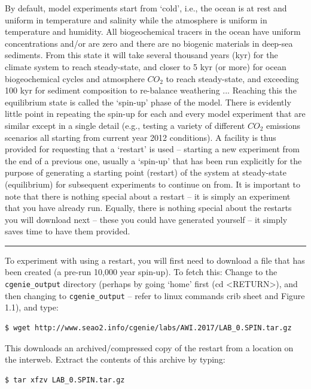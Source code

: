 \documentclass[11pt,fleqn]{book} %
\begin{document}
By default, model experiments start from ‘cold’, i.e., the ocean is at rest and uniform in temperature and salinity while the atmosphere is uniform in temperature and humidity. All biogeochemical tracers in the ocean have uniform concentrations and/or are zero and there are no biogenic materials in deep-sea sediments. From this state it will take several thousand years (kyr) for the climate system to reach steady-state, and closer to 5 kyr (or more) for ocean biogeochemical cycles and atmosphere \(CO_{2}\) to reach steady-state, and exceeding 100 kyr for sediment composition to re-balance weathering ... Reaching this the equilibrium state is called the ‘spin-up’ phase of the model.
There is evidently little point in repeating the spin-up for each and every model experiment that are similar except in a single detail (e.g., testing a variety of different \(CO_{2}\) emissions scenarios all starting from current year 2012 conditions). A facility is thus provided for requesting that a ‘restart’ is used – starting a new experiment from the end of a previous one, usually a ‘spin-up’ that has been run explicitly for the purpose of generating a starting point (restart) of the system at steady-state (equilibrium) for subsequent experiments to continue on from.
It is important to note that there is nothing special about a restart – it is simply an experiment that you have already run. Equally, there is nothing special about the restarts you will download next – these you could have generated yourself – it simply saves time to have them provided.

\vspace{1mm}
\noindent\rule{4cm}{0.1mm}
\vspace{2mm}

\noindent To experiment with using a restart, you will first need to download a file that has been created (a pre-run 10,000 year spin-up). To fetch this: Change to the \texttt{cgenie\_output} directory (perhaps by going ‘home’ first (cd <RETURN>), and then changing to \texttt{cgenie\_output} – refer to linux commands crib sheet and Figure 1.1), and type:

\begin{verbatim}
$ wget http://www.seao2.info/cgenie/labs/AWI.2017/LAB_0.SPIN.tar.gz
\end{verbatim}

This downloads an archived/compressed copy of the restart from a location on the interweb. Extract the contents of this archive by typing:

\begin{verbatim}
$ tar xfzv LAB_0.SPIN.tar.gz
\end{verbatim}
\end{document}
